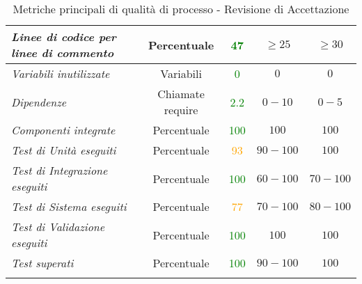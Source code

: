 \begin{longtable}{|>{\centering}m{5cm}|c|c|c|c|}
\emph{Linee di codice per linee di commento} & {Percentuale} & \textcolor{Green}{47} & $\geq 25$ & $\geq 30$\\ \hline
\emph{Variabili inutilizzate} & {Variabili} & \textcolor{Green}{0} & $0$ & $0$\\ \hline
\emph{Dipendenze} & {Chiamate require} & \textcolor{Green}{2.2} & $0 - 10$ & $0 - 5$\\ \hline
\emph{Componenti integrate} & {Percentuale} & \textcolor{Green}{100} & $100$ & $100$\\ \hline
\emph{Test di Unità eseguiti} & {Percentuale} & \textcolor{Orange}{93} & $90 - 100$ & $100$\\ \hline
\emph{Test di Integrazione eseguiti} & {Percentuale} & \textcolor{Green}{100} & $60 - 100$ & $70 - 100$\\ \hline
\emph{Test di Sistema eseguiti} & {Percentuale} & \textcolor{Orange}{77} & $70 - 100$ & $80 - 100$\\ \hline
\emph{Test di Validazione eseguiti} & {Percentuale} & \textcolor{Green}{100} & $100$ & $100$\\ \hline
\emph{Test superati} & {Percentuale} & \textcolor{Green}{100} & $90 - 100$ & $100$\\ \hline
\caption{Metriche principali di qualità di processo - Revisione di Accettazione}
\end{longtable}

